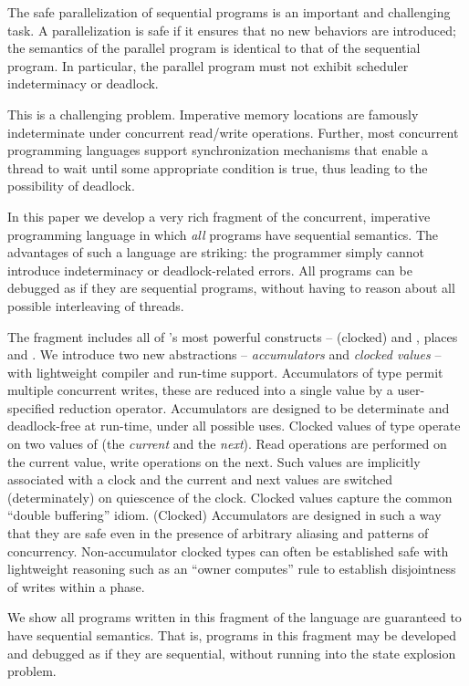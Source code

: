 
The safe parallelization of sequential programs is an important and
challenging task. A parallelization is safe if it ensures that no new
behaviors are introduced; the semantics of the parallel program is
identical to that of the sequential program. In particular, the
parallel program must not exhibit scheduler indeterminacy or deadlock.

This is a challenging problem.  Imperative memory locations are
famously indeterminate under concurrent read/write
operations. Further, most concurrent programming languages support
synchronization mechanisms that enable a thread to wait until some
appropriate condition is true, thus leading to the possibility of
deadlock.

In this paper we develop a very rich fragment of the concurrent,
imperative programming language \Xten{} in which {\em all} programs
have sequential semantics. The advantages of such a language are
striking: the programmer simply cannot introduce indeterminacy or
deadlock-related errors. All programs can be debugged as if they are
sequential programs, without having to reason about all possible
interleaving of threads.

The fragment includes all of \Xten{}'s most powerful constructs --
(clocked)  and , places and {}. We
introduce two new abstractions -- {\em accumulators} and {\em clocked
  values} -- with lightweight compiler and run-time
support. Accumulators of type  permit multiple concurrent
writes, these are reduced into a single value by a user-specified
reduction operator. Accumulators are designed to be determinate and
deadlock-free at run-time, under all possible uses.  Clocked values of
type  operate on two values of  (the {\em current} and
the {\em next}). Read operations are performed on the current value,
write operations on the next. Such values are implicitly associated
with a clock and the current and next values are switched
(determinately) on quiescence of the clock. Clocked values capture the
common ``double buffering'' idiom. (Clocked) Accumulators are designed
in such a way that they are safe even in the presence of arbitrary
aliasing and patterns of concurrency. Non-accumulator clocked types
can often be established safe with lightweight reasoning such as an
``owner computes'' rule to establish disjointness of writes within a phase.

We show all programs written in this fragment of the language are
guaranteed to have sequential semantics. That is, programs in this
fragment may be developed and debugged as if they are sequential,
without running into the state explosion problem.

